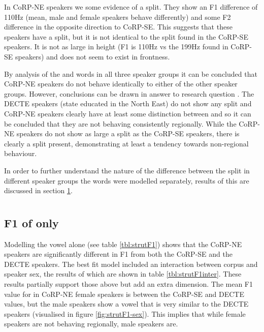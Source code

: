 \documentclass[../../../00.FullDoc/tex/ThesisSkeleton-draft2]{subfiles}
\begin{document}
In CoRP-NE speakers we some evidence of a split. They show an F1 difference of 110Hz (mean, male and female speakers behave differently) and some F2 difference in the opposite direction to CoRP-SE. This suggests that these speakers have a split, but it is not identical to the split found in the CoRP-SE speakers. It is not as large in height (F1 is 110Hz vs the 199Hz found in CoRP-SE speakers) and does not seem to exist in frontness.

By analysis of the \foot{} and \strutt{} words in all three speaker groups it can be concluded that CoRP-NE speakers do not behave identically to either of the other speaker groups. However, conclusions can be drawn in answer to research question \notinsubfile{\ref{RQ1}}. The DECTE speakers (state educated in the North East) do not show any \FS{} split and CoRP-NE speakers clearly have at least some distinction between \foot{} and \strutt{} so it can be concluded that they are not behaving consistently regionally. While the CoRP-NE speakers do not show as large a split as the CoRP-SE speakers, there is clearly a split present, demonstrating at least a tendency towards non-regional behaviour.

In order to further understand the nature of the difference between the split in different speaker groups the \strutt{} words were modelled separately, results of this are discussed in section \ref{sec:FSSTRUT}.

\section{} \label{sec:FSSTRUT}
\subsection{F1 of  only}

Modelling the \strutt{} vowel alone (see table \ref{tbl:strutF1}) shows that the CoRP-NE speakers are significantly different in F1 from both the CoRP-SE and the DECTE speakers. The best fit model included an interaction between corpus and speaker sex, the results of which are shown in table \ref{tbl:strutF1inter}. These results partially support those above but add an extra dimension. The mean F1 value for \strutt{} in CoRP-NE female speakers is between the CoRP-SE and DECTE values, but the male speakers show a vowel that is very similar to the DECTE speakers (visualised in figure \ref{fig:strutF1-sex}). This implies that while female speakers are not behaving regionally, male speakers are.
\end{document}
